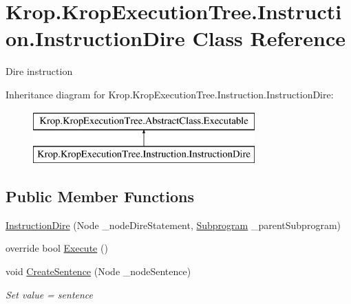 \hypertarget{class_krop_1_1_krop_execution_tree_1_1_instruction_1_1_instruction_dire}{}\section{Krop.\+Krop\+Execution\+Tree.\+Instruction.\+Instruction\+Dire Class Reference}
\label{class_krop_1_1_krop_execution_tree_1_1_instruction_1_1_instruction_dire}


Dire instruction  


Inheritance diagram for Krop.\+Krop\+Execution\+Tree.\+Instruction.\+Instruction\+Dire\+:\begin{figure}[H]
\begin{center}
\leavevmode
\includegraphics[height=2.000000cm]{class_krop_1_1_krop_execution_tree_1_1_instruction_1_1_instruction_dire}
\end{center}
\end{figure}
\subsection*{Public Member Functions}
\begin{DoxyCompactItemize}
\item 
\mbox{\hyperlink{class_krop_1_1_krop_execution_tree_1_1_instruction_1_1_instruction_dire_a5271ea25f2ef2b2a8b46db0b71efb3c7}{Instruction\+Dire}} (Node \+\_\+node\+Dire\+Statement, \mbox{\hyperlink{class_krop_1_1_krop_execution_tree_1_1_subprogram}{Subprogram}} \+\_\+parent\+Subprogram)
\item 
override bool \mbox{\hyperlink{class_krop_1_1_krop_execution_tree_1_1_instruction_1_1_instruction_dire_aef86c4e6b9ac3a4d17ed0c88db50a894}{Execute}} ()
\item 
void \mbox{\hyperlink{class_krop_1_1_krop_execution_tree_1_1_instruction_1_1_instruction_dire_adc2a2a8af353fbafe62bafc3e7116534}{Create\+Sentence}} (Node \+\_\+node\+Sentence)
\begin{DoxyCompactList}\small\item\em Set value = sentence \end{DoxyCompactList}\end{DoxyCompactItemize}


